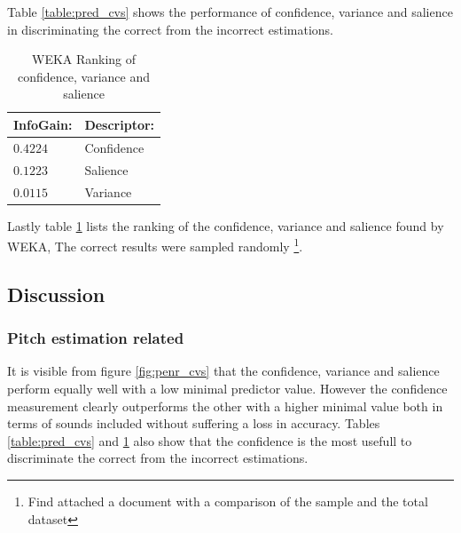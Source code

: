 \documentclass{article}
\begin{document}
Table \ref{table:pred_cvs} shows the performance of confidence, variance and salience in discriminating the correct from the incorrect estimations.
\begin{table}[h]
    \begin{center}
        \begin{tabular}{ | l | l |}
            \hline
            InfoGain:   &   Descriptor: \\  \hline
            \hline
            $0.4224$    &   Confidence  \\  \hline
            $0.1223$    &   Salience    \\  \hline
            $0.0115$    &   Variance    \\  \hline
        \end{tabular}
        \caption{WEKA Ranking of confidence, variance and salience}
        \label{table:weka_cvs}
    \end{center}
\end{table}
Lastly table \ref{table:weka_cvs} lists the ranking of the confidence, variance and salience found by WEKA, The correct results were sampled randomly \footnote{Find attached a document with a comparison of the sample and the total dataset}.

 
\subsection{Discussion}
\subsubsection{Pitch estimation related}
It is visible from figure \ref{fig:penr_cvs}  that the confidence, variance and salience perform equally well with a low minimal predictor value. However the confidence measurement clearly outperforms the other with a higher minimal value both in terms of sounds included without suffering a loss in accuracy. Tables \ref{table:pred_cvs} and \ref{table:weka_cvs} also show that the confidence is the most usefull to discriminate the correct from the incorrect estimations. 



\end{document}
